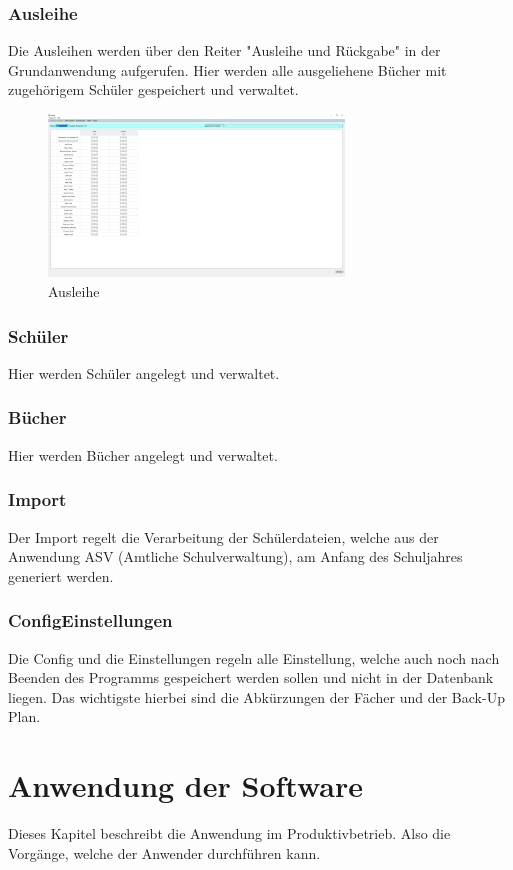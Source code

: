 \subsubsection{Ausleihe}
Die Ausleihen werden über den Reiter "Ausleihe und Rückgabe" in der Grundanwendung aufgerufen. Hier werden alle ausgeliehene Bücher mit zugehörigem Schüler gespeichert und verwaltet.
\begin{figure}[H]
	\centering
		\includegraphics[width=0.70\textwidth]{figures/lendings.png}
	\caption{Ausleihe}
	\label{fig:lendings}
\end{figure}

\subsubsection{Schüler}
Hier werden Schüler angelegt und verwaltet.


\subsubsection{Bücher}
Hier werden Bücher angelegt und verwaltet.


\subsubsection{Import}
Der Import regelt die Verarbeitung der Schülerdateien, welche aus der Anwendung ASV (Amtliche Schulverwaltung), am Anfang des Schuljahres generiert werden.


\subsubsection{Config\/Einstellungen}
Die Config und die Einstellungen regeln alle Einstellung, welche auch noch nach Beenden des Programms gespeichert werden sollen und nicht in der Datenbank liegen. Das wichtigste hierbei sind die Abkürzungen der Fächer und der Back-Up Plan.



\section{Anwendung der Software}
Dieses Kapitel beschreibt die Anwendung im Produktivbetrieb. Also die Vorgänge, welche der Anwender durchführen kann.

